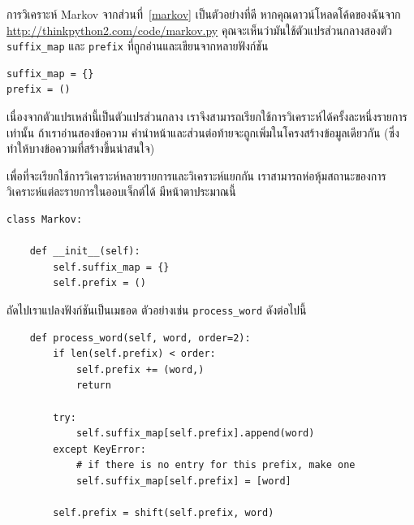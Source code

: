 การวิเคราะห์ Markov จากส่วนที่~\ref{markov} เป็นตัวอย่างที่ดี หากคุณดาวน์โหลดโค้ดของฉันจาก \url{http://thinkpython2.com/code/markov.py} 
คุณจะเห็นว่ามันใช้ตัวแปรส่วนกลางสองตัว \verb"suffix_map" และ \verb"prefix" ที่ถูกอ่านและเขียนจากหลายฟังก์ชัน


\begin{verbatim}
suffix_map = {}        
prefix = ()            
\end{verbatim}


เนื่องจากตัวแปรเหล่านี้เป็นตัวแปรส่วนกลาง เราจึงสามารถเรียกใช้การวิเคราะห์ได้ครั้งละหนึ่งรายการเท่านั้น 
ถ้าเราอ่านสองข้อความ คำนำหน้าและส่วนต่อท้ายจะถูกเพิ่มในโครงสร้างข้อมูลเดียวกัน (ซึ่งทำให้บางข้อความที่สร้างขึ้นน่าสนใจ)


เพื่อที่จะเรียกใช้การวิเคราะห์หลายรายการและวิเคราะห์แยกกัน เราสามารถห่อหุ้มสถานะของการวิเคราะห์แต่ละรายการในออบเจ็กต์ได้ มีหน้าตาประมาณนี้

\begin{verbatim}
class Markov:

    def __init__(self):
        self.suffix_map = {}
        self.prefix = ()    
\end{verbatim}


ถัดไปเราแปลงฟังก์ชันเป็นเมธอด ตัวอย่างเช่น \verb"process_word" ดังต่อไปนี้

\begin{verbatim}
    def process_word(self, word, order=2):
        if len(self.prefix) < order:
            self.prefix += (word,)
            return

        try:
            self.suffix_map[self.prefix].append(word)
        except KeyError:
            # if there is no entry for this prefix, make one
            self.suffix_map[self.prefix] = [word]

        self.prefix = shift(self.prefix, word)        
\end{verbatim}


